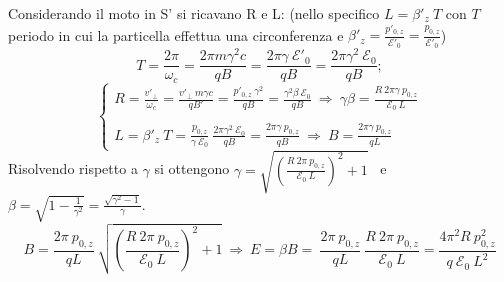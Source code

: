 \documentclass[12pt,twoside,a4]{article}
\begin{document}
\begin{solution}
Considerando il moto in S' si ricavano R e L: 
(nello specifico $L = \beta'_z \ T$ con $T$ periodo in cui la particella effettua una circonferenza e $\beta'_z = \frac{p'_{0,z}}{\mathcal{E}'_0} = \frac{p_{0,z}}{\mathcal{E}'_0}$)
\begin{equation*}
    T =  \frac{2\pi}{\omega_c} = \frac{2\pi m \gamma^2 c}{qB} =  \frac{2\pi  \gamma \ \mathcal{E}'_0}{qB} = \frac{2\pi  \gamma^2 \ \mathcal{E}_0}{qB};
\end{equation*}
\begin{equation*}
\begin{cases}
R = \frac{v'_\bot}{\omega_c} = \frac{v'_\bot \ m \gamma c}{q B'} = \frac{p'_{0,z} \ \gamma^2}{qB} = \frac{\gamma^2 \beta \ \mathcal{E}_0}{qB}  \  \Rightarrow  \  \gamma \beta = \frac{R \ 2\pi \gamma \ p_{0,z}}{\mathcal{E}_0 \ L}\\
\\
L = \beta'_z \ T = \frac{p_{0,z}}{\gamma \ \mathcal{E}_0} \ \frac{2\pi  \gamma^2 \ \mathcal{E}_0}{qB}  = \frac{2\pi \gamma \ p_{0,z}}{ qB}  \  \Rightarrow  \  B = \frac{2\pi \gamma \ p_{0,z}}{q L}
\end{cases}
\end{equation*}
Risolvendo rispetto a $\gamma$ si ottengono $\gamma = \sqrt{\left(\frac{R \ 2\pi \ p_{0,z}}{\mathcal{E}_0 \ L}\right)^2 + 1}$ \  e  \ $\beta = \sqrt{1 - \frac{1}{\gamma^2}} = \frac{\sqrt{\gamma^2-1}}{\gamma}$.
\begin{equation*}
    B = \frac{2\pi \ p_{0,z}}{q L} \ \sqrt{\left(\frac{R \ 2\pi \ p_{0,z}}{\mathcal{E}_0 \ L}\right)^2 + 1}  \  \Rightarrow  \  E = \beta B = \ \frac{2\pi \ p_{0,z}}{q L} \ \frac{R \ 2\pi \ p_{0,z}}{\mathcal{E}_0 \ L} = \frac{4\pi^2 R \ p^2_{0,z}}{q \ \mathcal{E}_0 \ L^2}
\end{equation*}

\end{solution}


\newpage
\end{document}
